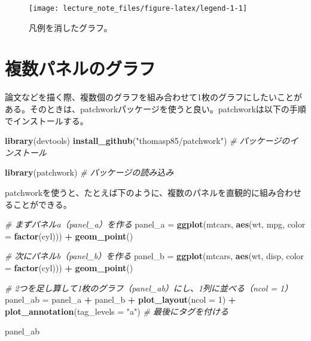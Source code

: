 \documentclass[]{book}
\newenvironment{Shaded}{\begin{snugshade}}{\end{snugshade}}
\newcommand{\KeywordTok}[1]{\textcolor[rgb]{0.13,0.29,0.53}{\textbf{#1}}}
\newcommand{\DataTypeTok}[1]{\textcolor[rgb]{0.13,0.29,0.53}{#1}}
\newcommand{\DecValTok}[1]{\textcolor[rgb]{0.00,0.00,0.81}{#1}}
\newcommand{\StringTok}[1]{\textcolor[rgb]{0.31,0.60,0.02}{#1}}
\newcommand{\CommentTok}[1]{\textcolor[rgb]{0.56,0.35,0.01}{\textit{#1}}}
\newcommand{\OperatorTok}[1]{\textcolor[rgb]{0.81,0.36,0.00}{\textbf{#1}}}
\newcommand{\NormalTok}[1]{#1}
\begin{document}
\begin{figure}

{\centering \texttt{[image: lecture\_note\_files/figure-latex/legend-1-1]} 

}

\caption{凡例を消したグラフ。}\label{fig:legend-1}
\end{figure}

\section{複数パネルのグラフ}

論文などを描く際、複数個のグラフを組み合わせて1枚のグラフにしたいことがある。そのときは、patchworkパッケージを使うと良い。patchworkは以下の手順でインストールする。

\begin{Shaded}
\begin{Highlighting}[]
\KeywordTok{library}\NormalTok{(devtools)}
\KeywordTok{install_github}\NormalTok{(}\StringTok{"thomasp85/patchwork"}\NormalTok{) }\CommentTok{# パッケージのインストール}
\end{Highlighting}
\end{Shaded}

\begin{Shaded}
\begin{Highlighting}[]
\KeywordTok{library}\NormalTok{(patchwork) }\CommentTok{# パッケージの読み込み}
\end{Highlighting}
\end{Shaded}

patchworkを使うと、たとえば下のように、複数のパネルを直観的に組み合わせることができる。



\begin{Shaded}
\begin{Highlighting}[]
\CommentTok{# まずパネルa（panel_a）を作る}
\NormalTok{panel_a =}\StringTok{ }\KeywordTok{ggplot}\NormalTok{(mtcars, }\KeywordTok{aes}\NormalTok{(wt, mpg, }\DataTypeTok{color =} \KeywordTok{factor}\NormalTok{(cyl))) }\OperatorTok{+}
\StringTok{  }\KeywordTok{geom_point}\NormalTok{()}

\CommentTok{# 次にパネルb（panel_b）を作る}
\NormalTok{panel_b =}\StringTok{ }\KeywordTok{ggplot}\NormalTok{(mtcars, }\KeywordTok{aes}\NormalTok{(wt, disp, }\DataTypeTok{color =} \KeywordTok{factor}\NormalTok{(cyl))) }\OperatorTok{+}
\StringTok{  }\KeywordTok{geom_point}\NormalTok{()}

\CommentTok{# 2つを足し算して1枚のグラフ（panel_ab）にし、1列に並べる（ncol = 1）}
\NormalTok{panel_ab =}\StringTok{ }\NormalTok{panel_a }\OperatorTok{+}\StringTok{ }\NormalTok{panel_b }\OperatorTok{+}\StringTok{ }
\StringTok{  }\KeywordTok{plot_layout}\NormalTok{(}\DataTypeTok{ncol =} \DecValTok{1}\NormalTok{) }\OperatorTok{+}\StringTok{ }
\StringTok{  }\KeywordTok{plot_annotation}\NormalTok{(}\DataTypeTok{tag_levels =} \StringTok{"a"}\NormalTok{) }\CommentTok{# 最後にタグを付ける}

\NormalTok{panel_ab}
\end{Highlighting}
\end{Shaded}
\end{document}
